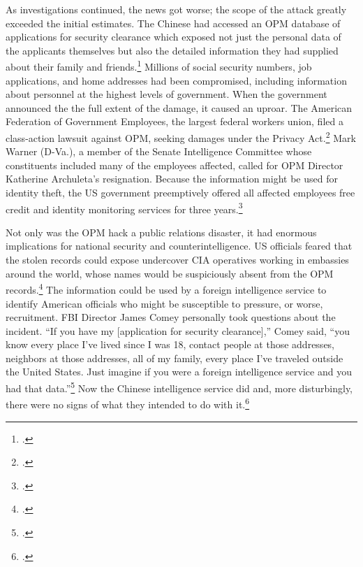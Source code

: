\documentclass{memoir}
\begin{document}
\begin{refsegment}
As investigations continued, the news got worse; the scope of the attack greatly exceeded the initial estimates. The Chinese had accessed an OPM database of applications for security clearance which exposed not just the personal data of the applicants themselves but also the detailed information they had supplied about their family and friends.\footcite{nakashima_hacks_2015} Millions of social security numbers, job applications, and home addresses had been compromised, including information about personnel at the highest levels of government. When the government announced the the full extent of the damage, it caused an uproar. The American Federation of Government Employees, the largest federal workers union, filed a class-action lawsuit against OPM, seeking damages under the Privacy Act.\footcite[The lawsuits were later dismissed.]{chalfant_court_2017} Mark Warner (D-Va.), a member of the Senate Intelligence Committee whose constituents included many of the employees affected, called for OPM Director Katherine Archuleta's resignation. Because the information might be used for identity theft, the US government preemptively offered all affected employees free credit and identity monitoring services for three years.\footcite{nakashima_hacks_2015}

Not only was the OPM hack a public relations disaster, it had enormous implications for national security and counterintelligence. US officials feared that the stolen records could expose undercover CIA operatives working in embassies around the world, whose names would be suspiciously absent from the OPM records.\footcite{nakashima_hacks_2015} The information could be used by a foreign intelligence service to identify American officials who might be susceptible to pressure, or worse, recruitment. FBI Director James Comey personally took questions about the incident. ``If you have my [application for security clearance],'' Comey said, ``you know every place I've lived since I was 18, contact people at those addresses, neighbors at those addresses, all of my family, every place I've traveled outside the United States. Just imagine if you were a foreign intelligence service and you had that data.''\footcite{nakashima_hacks_2015} Now the Chinese intelligence service did and, more disturbingly, there were no signs of what they intended to do with it.\footcite{koerner_inside_2016}


\end{refsegment}
\end{document}
